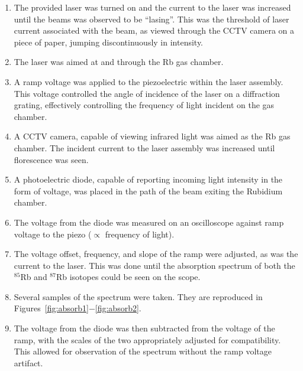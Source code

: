 \documentclass[paper=a4, fontsize=11pt]{scrartcl} %
\numberwithin{equation}{section}
\numberwithin{figure}{section}
\numberwithin{table}{section}
\begin{document}
\begin{enumerate}
\item The provided laser was turned on and the current to the laser
  was increased until the beams was observed to be ``lasing''. This
  was the threshold of laser current associated with the beam, as viewed through
  the CCTV camera on a piece of paper, jumping discontinuously in intensity. 
\item The laser was aimed at and through the Rb gas chamber.
\item A ramp voltage was applied to the piezoelectric within the laser
  assembly. This voltage controlled the angle of incidence of the
  laser on a diffraction grating, effectively controlling the
  frequency of light incident on the gas chamber. 
\item A CCTV camera, capable of viewing infrared light was aimed as the Rb gas chamber. The incident current to the laser assembly was increased until florescence was seen.
\item A photoelectric diode, capable of reporting incoming light
  intensity in the form of voltage, was placed in the path of the beam
  exiting the Rubidium chamber.
\item The voltage from the diode was measured on an oscilloscope
  against ramp voltage to the piezo ($\propto$ frequency of light).
\item The voltage offset, frequency, and slope of the ramp were adjusted, as was the current to the laser. This was done until the absorption spectrum of both the $^{85}$Rb and $^{87}$Rb isotopes could be seen on the scope.
\item Several samples of the spectrum were taken. They are reproduced in Figures~\ref{fig:absorb1}$-$\ref{fig:absorb2}.
\item The voltage from the diode was then subtracted from the voltage of the ramp, with the scales of the two appropriately adjusted for compatibility. This allowed for observation of the spectrum without the ramp voltage artifact.
\end{enumerate}
\end{document}
